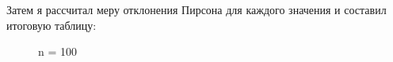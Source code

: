 \documentclass[a4paper,12pt, oneside]{book}
\begin{document}
Затем я рассчитал меру отклонения Пирсона для каждого значения и составил итоговую таблицу:

\begin{figure}[h!]
	\begin{center}
		\begin{minipage}[h]{0.47\linewidth}
			 n = 100 \\
		\end{minipage}
	\end{center}
\end{figure}
\end{document}
